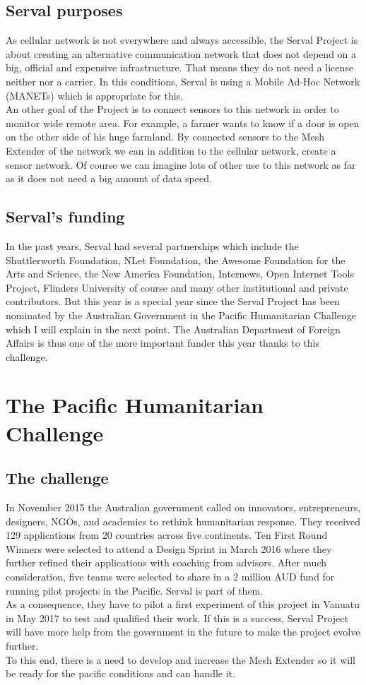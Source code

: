 \subsection{Serval purposes}
As cellular network is not everywhere and always accessible, the Serval Project is about creating an alternative communication network that does not depend on a big, official and expensive infrastructure. That means they do not need a license neither nor a carrier. In this conditions, Serval is using a Mobile Ad-Hoc Network (MANETs) which is appropriate for this. \\
An other goal of the Project is to connect sensors to this network in order to monitor wide remote area. For example, a farmer wants to know if a door is open on the other side of his huge farmland. By connected sensors to the Mesh Extender of the network we can in addition to the cellular network, create a sensor network. Of course we can imagine lots of other use to this network as far as it does not need a big amount of data speed. 

\subsection{Serval's funding}
In the past years, Serval had several partnerships which include the Shuttlerworth Foundation, NLet Foundation, the Awesome Foundation for the Arts and Science, the New America Foundation, Internews, Open Internet Tools Project, Flinders University of course and many other institutional and private contributors. But this year is a special year since the Serval Project has been nominated by the Australian Government in the Pacific Humanitarian Challenge which I will explain in the next point. The Australian Department of Foreign Affairs is thus one of the more important funder this year thanks to this challenge. 


\section{The Pacific Humanitarian Challenge}
\subsection{The challenge}
In November 2015 the Australian government called on innovators, entrepreneurs, designers, NGOs, and academics to rethink humanitarian response. They received 129 applications from 20 countries across five continents. Ten First Round Winners were selected to attend a Design Sprint in March 2016 where they further refined their applications with coaching from advisors. After much consideration, five teams were selected to share in a 2 million AUD fund for running pilot projects in the Pacific. Serval is part of them. \\
As a consequence, they have to pilot a first experiment of this project in Vanuatu in May 2017 to test and qualified their work. If this is a success, Serval Project will have more help from the government in the future to make the project evolve further. \\
To this end, there is a need to develop and increase the Mesh Extender so it will be ready for the pacific conditions and can handle it.

